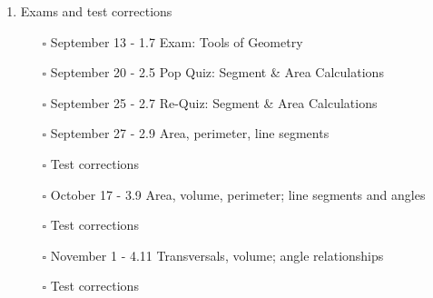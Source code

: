 \documentclass[12pt, twoside]{article}
\begin{document}
\begin{enumerate}
  \item Exams and test corrections
    \begin{itemize}
      \item[$\square$] September 13 - 1.7 Exam: Tools of Geometry
      \item[$\square$] September 20 - 2.5 Pop Quiz: Segment \& Area Calculations
      \item[$\square$] September 25 - 2.7 Re-Quiz: Segment \& Area Calculations
      \item[$\square$] September 27 - 2.9 Area, perimeter, line segments
          \item[$\square$] Test corrections
      \item[$\square$] October 17 - 3.9 Area, volume, perimeter; line segments and angles
        \item[$\square$] Test corrections
     \item[$\square$] November 1 - 4.11 Transversals, volume; angle relationships
      \item[$\square$] Test corrections
\end{itemize}

\end{enumerate}
\end{document}
